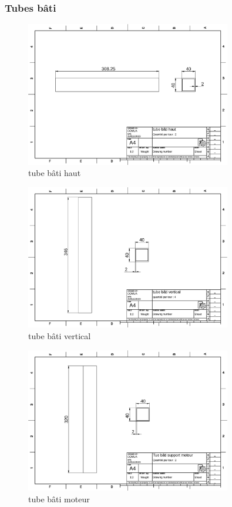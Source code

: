 \documentclass[a4paper]{article}
\begin{document}
\subsubsection{Tubes bâti}
\begin{figure}[H]
    \centering
    \includegraphics*[width=0.8\textwidth]{../plans/tube-bati-haut}
    \caption{tube bâti haut}
    \label{fig:tube-bati-haut}
\end{figure}
\begin{figure}[H]
    \centering
    \includegraphics*[width=0.8\textwidth]{../plans/tube-bati-vertical}
    \caption{tube bâti vertical}
    \label{fig:tube-bati-vertical}
\end{figure}
\begin{figure}[H]
    \centering
    \includegraphics*[width=0.8\textwidth]{../plans/tube-bati-moteur}
    \caption{tube bâti moteur}
    \label{fig:tube-bati-moteur}
\end{figure}
\end{document}
